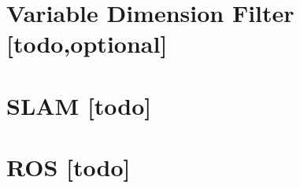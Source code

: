 \begin{comment}
------------------------------------------------------------------------------------------
- \cite{kurth2003experimental}
	- Additionally, we will extend the batch method to produce a variable dimension lter, as used by Deans for the case of bearing-only sensors [3], which would consider some window of previous robot states and optimize the position estimates based on the data in that window.
\end{comment}
\section{Variable Dimension Filter [todo,optional]}


\begin{comment}
------------------------------------------------------------------------------------------
Embodied Localisation and Mapping
http://elib.suub.uni-bremen.de/edocs/00103537-1.pdf

- \cite{sarkka2013bayesian}
	- Bayesian filtering and smoothing
- \cite{kurth2003experimental}
	- The Kalman lter approach described in Section 5 can be reformulated for the SLAM problem. To perform SLAM, we include position estimates for each tag in the state, producing a state vector of the form: q(k) = [xk; yk; k; xb1; yb1 ; :::; xbn; ybn]T , where n is the number of beacons.
\end{comment}
\section{SLAM [todo]}



\begin{comment}
------------------------------------------------------------------------------------------
\end{comment}
\section{ROS [todo]}